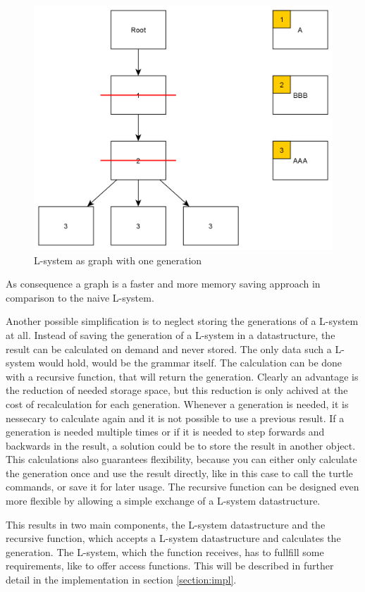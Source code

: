 \documentclass[english]{cpp-hmwk}
\begin{document}
\begin{figure}[h!]
	\centering
	\includegraphics[width=0.8\columnwidth]{../graphs/lsystem_graph_reduced2_example.png}
	\caption{L-system as graph with one generation}
	\label{figure:lsystem_graph_one_generation}
\end{figure}

\medskip
\noindent As consequence a graph is a faster and more memory saving approach in comparison to the naive L-system.

\bigskip

\noindent Another possible simplification is to neglect storing the generations of a L-system at all. Instead of saving the generation of a L-system in a datastructure, the result can be calculated on demand and never stored. The only data such a L-system would hold, would be the grammar itself. The calculation can be done with a recursive function, that will return the generation. Clearly an advantage is the reduction of needed storage space, but this reduction is only achived at the cost of recalculation for each generation. Whenever a generation is needed, it is nessecary to calculate again and it is not possible to use a previous result.
If a generation is needed multiple times or if it is needed to step forwards and backwards in the result, a solution could be to store the result in another object. This calculations also guarantees flexibility, because you can either only calculate the generation once and use the result directly, like in this case to call the turtle commands, or save it for later usage. The recursive function can be designed even more flexible by allowing a simple exchange of a L-system datastructure.

This results in two main components, the L-system datastructure and the recursive function, which accepts a L-system datastructure and calculates the generation. The L-system, which the function receives, has to fullfill some requirements, like to offer access functions. This will be described in further detail in the implementation in section \ref{section:impl}.
 
\end{document}
